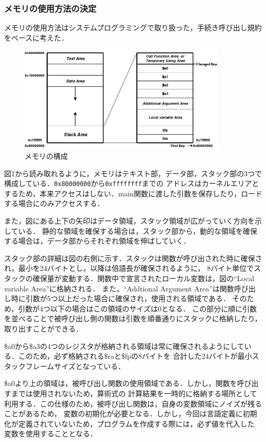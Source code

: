 \documentclass[a4paper,11pt]{jarticle}
\begin{document}
{\subsubsection{メモリの使用方法の決定}
メモリの使用方法はシステムプログラミングで取り扱った，手続き呼び出し規約をベースに考えた．
\begin{figure}[htbp]
 \begin{center}
  \includegraphics[bb=0 0 691 351,width=100mm]{memory.jpg}
 \end{center}
 \caption{メモリの構成}
 \label{fig:one}
\end{figure}

図1から読み取れるように，メモリはテキスト部，データ部，スタック部の3つで構成している．\verb|0x80000000|から\verb|0xffffffff|までの
アドレスはカーネルエリアとするため，本来アクセスはしない．main関数に渡した引数を保存したり，ロードする場合にのみアクセスする．

また，図にある上下の矢印はデータ領域，スタック領域が広がっていく方向を示している．
静的な領域を確保する場合は，スタック部から，動的な領域を確保する場合は，データ部からそれぞれ領域を伸ばしていく．

スタック部の詳細は図の右側に示す．スタックは関数が呼び出された時に確保され，最小を24バイトとし，以降は倍語長が確保されるように，
8バイト単位でスタックの確保量が変動する．関数中で宣言されたローカル変数は，図の``Local variable Area''に格納される．
また，``Addtional Argument Area''は関数呼び出し時に引数が5つ以上だった場合に確保され，使用される領域である．
そのため，引数が4つ以下の場合はこの領域のサイズは0となる．
この部分に順に引数を並べることで被呼び出し側の関数は引数を順番通りにスタックに格納したり，取り出すことができる．

\$a0から\$a3の4つのレジスタが格納される領域は常に確保されるようにしている．このため，必ず格納される\$raと\$fpの8バイトを
合計した24バイトが最小スタックフレームサイズとなっている．

\$a0より上の領域は，被呼び出し関数の使用領域である．しかし，関数を呼び出すまでは使用されないため，算術式の
計算結果を一時的に格納する場所として利用する．この仕様のため，被呼び出し関数は，自身の変数領域にノイズが残ることがあるため，
変数の初期化が必要となる．しかし，今回は言語定義に初期化が定義されていないため，プログラムを作成する際には，必ず値を代入した
変数を使用することとなる．

}
\end{document}
